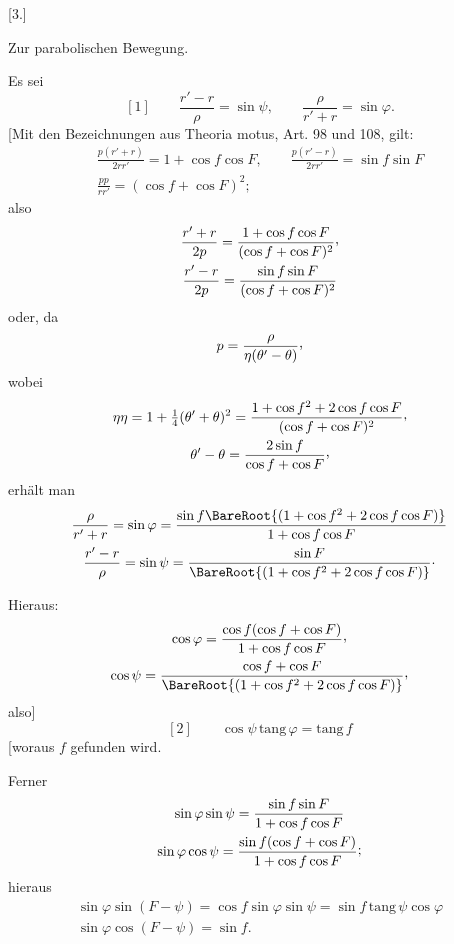 \clearpage
{}
\begin{center}
[3.]\par
\medskip
Zur parabolischen Bewegung.\par
{}
\end{center}

Es sei
\[
\mathrm{[1]}\qquad \frac{r'-r}{\rho}=\sin\psi,\qquad \frac{\rho}{r'+r}=\sin\varphi.
\]
[Mit den Bezeichnungen aus Theoria motus, Art. 98 und 108, gilt:
\[
\begin{gathered}
\frac{p(r'+r)}{2rr'}=1+\cos f\cos F,\qquad
\frac{p(r'-r)}{2rr'}=\sin f\sin F\\
\frac{pp}{rr'}=(\cos f+\cos F)^2;
\end{gathered}
\]
also
\[
\begin{gathered}
\frac{r'+r}{2p}=\frac{1+\cos f\cos F}{(\cos f+\cos F)^2}\mathpunct{\raisebox{.45ex}{,}}\\
\frac{r'-r}{2p}=\frac{\sin f\sin F}{(\cos f+\cos F)^2}
\end{gathered}
\]
oder, da
\[
p=\frac{\rho}{\eta(\theta'-\theta)}\mathpunct{\raisebox{.45ex}{,}}
\]
wobei
\[
\begin{gathered}
\eta\eta=1+\tfrac14(\theta'+\theta)^2=\frac{1+\cos f^2+2\cos f\cos F}{(\cos f+\cos F)^2}\mathpunct{\raisebox{.45ex}{,}}\\
\theta'-\theta=\frac{2\sin f}{\cos f+\cos F}\mathpunct{\raisebox{.45ex}{,}}
\end{gathered}
\]
erhält man
\[
\begin{gathered}
\frac{\rho}{r'+r}=\sin\varphi=\frac{\sin f\BareRoot{(1+\cos f^2+2\cos f\cos F)}}{1+\cos f\cos F}\\
\frac{r'-r}{\rho}=\sin\psi=\frac{\sin F}{\BareRoot{(1+\cos f^2+2\cos f\cos F)}}\mathpunct{\cdot}
\end{gathered}
\]

Hieraus:
\[
\begin{gathered}
\cos\varphi=\frac{\cos f(\cos f+\cos F)}{1+\cos f\cos F}\mathpunct{\raisebox{.45ex}{,}}\\
\cos\psi=\frac{\cos f+\cos F}{\BareRoot{(1+\cos f^2+2\cos f\cos F)}}\mathpunct{\raisebox{.45ex}{,}}
\end{gathered}
\]
also]
\[
\mathrm{[2]}\qquad \cos\psi\,\mathrm{tang}\,\varphi=\mathrm{tang}\,f
\]
[woraus \(f\) gefunden wird.

Ferner
\[
\begin{gathered}
\sin\varphi\sin\psi=\frac{\sin f\sin F}{1+\cos f\cos F}\\
\sin\varphi\cos\psi=\frac{\sin f(\cos f+\cos F)}{1+\cos f\cos F}\mathpunct{\raisebox{.25ex}{;}}
\end{gathered}
\]
hieraus
\[
\begin{gathered}
\sin\varphi\sin(F-\psi)=\cos f\sin\varphi\sin\psi=\sin f\,\mathrm{tang}\,\psi\cos\varphi\\
\sin\varphi\cos(F-\psi)=\sin f.
\end{gathered}
\]


